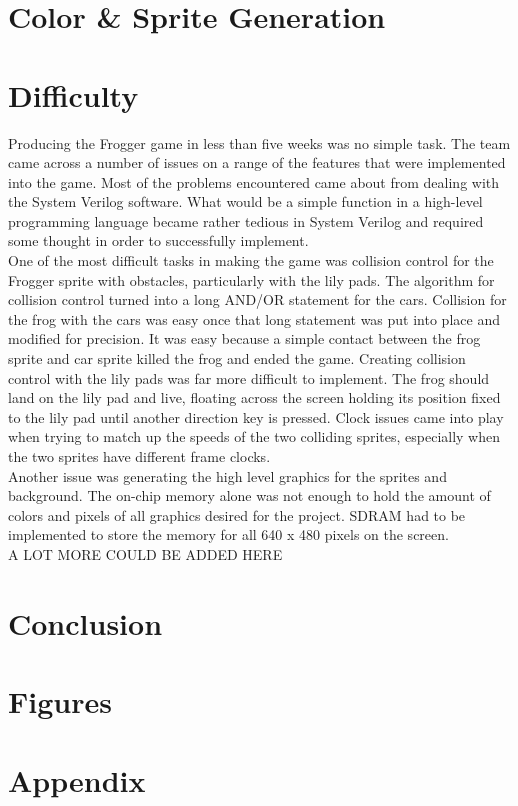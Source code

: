 \documentclass[journal, twocolumn, final,11pt,letterpaper]{IEEEtran}
\begin{document}
\section{Color \& Sprite Generation}



\section{ Difficulty}
Producing the Frogger game in less than five weeks was no simple task.  The team came across a number of issues on a range of the features that were implemented into the game.  Most of the problems encountered came about from dealing with the System Verilog software.  What would be a simple function in a high-level programming language became rather tedious in System Verilog and required some thought in order to successfully implement.  \\

One of the most difficult tasks in making the game was collision control for the Frogger sprite with obstacles, particularly with the lily pads.  The algorithm for collision control turned into a long AND/OR statement for the cars.  Collision for the frog with the cars was easy once that long statement was put into place and modified for precision.  It was easy because a simple contact between the frog sprite and car sprite killed the frog and ended the game.  Creating collision control with the lily pads was far more difficult to implement.  The frog should land on the lily pad and live, floating across the screen holding its position fixed to the lily pad until another direction key is pressed.  Clock issues came into play when trying to match up the speeds of the two colliding sprites, especially when the two sprites have different frame clocks.  \\

Another issue was generating the high level graphics for the sprites and background.  The on-chip memory alone was not enough to hold the amount of colors and pixels of all graphics desired for the project.  SDRAM had to be implemented to store the memory for all 640 x 480 pixels on the screen. \\

A LOT MORE COULD BE ADDED HERE\\

\section{Conclusion} 



\section{Figures}
\section*{Appendix}


%
%     
\end{document}
